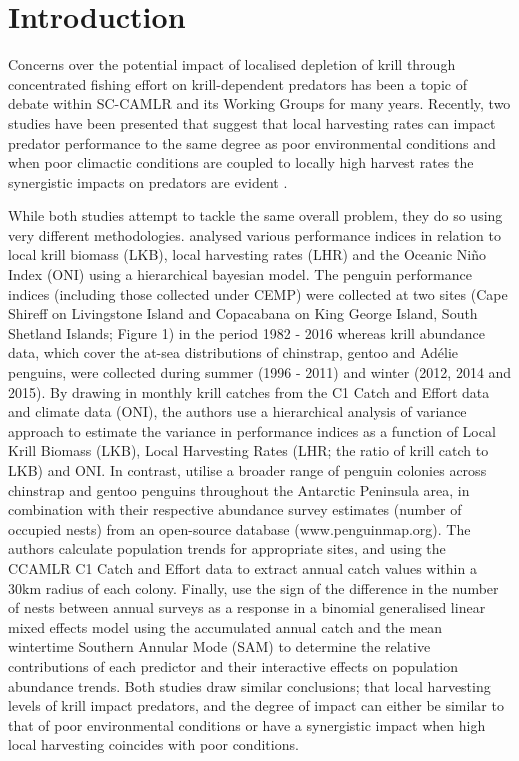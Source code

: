 \documentclass[]{elsarticle} %
\begin{document}
\section{Introduction}\label{introduction}

Concerns over the potential impact of localised depletion of krill
through concentrated fishing effort on krill-dependent predators has
been a topic of debate within SC-CAMLR and its Working Groups for many
years. Recently, two studies have been presented that suggest that local
harvesting rates can impact predator performance to the same degree as
poor environmental conditions \citep{Watters2020} and when poor
climactic conditions are coupled to locally high harvest rates the
synergistic impacts on predators are evident \citep{Kruger2021}.

While both studies attempt to tackle the same overall problem, they do
so using very different methodologies. \citet{Watters2020} analysed
various performance indices in relation to local krill biomass (LKB),
local harvesting rates (LHR) and the Oceanic Niño Index (ONI) using a
hierarchical bayesian model. The penguin performance indices (including
those collected under CEMP) were collected at two sites (Cape Shireff on
Livingstone Island and Copacabana on King George Island, South Shetland
Islands; Figure 1) in the period 1982 - 2016 whereas krill abundance
data, which cover the at-sea distributions of chinstrap, gentoo and
Adélie penguins, were collected during summer (1996 - 2011) and winter
(2012, 2014 and 2015). By drawing in monthly krill catches from the C1
Catch and Effort data and climate data (ONI), the authors use a
hierarchical analysis of variance approach to estimate the variance in
performance indices as a function of Local Krill Biomass (LKB), Local
Harvesting Rates (LHR; the ratio of krill catch to LKB) and ONI. In
contrast, \citet{Kruger2021} utilise a broader range of penguin colonies
across chinstrap and gentoo penguins throughout the Antarctic Peninsula
area, in combination with their respective abundance survey estimates
(number of occupied nests) from an open-source database
(www.penguinmap.org). The authors calculate population trends for
appropriate sites, and using the CCAMLR C1 Catch and Effort data to
extract annual catch values within a 30km radius of each colony.
Finally, \citet{Kruger2021} use the sign of the difference in the number
of nests between annual surveys as a response in a binomial generalised
linear mixed effects model using the accumulated annual catch and the
mean wintertime Southern Annular Mode (SAM) to determine the relative
contributions of each predictor and their interactive effects on
population abundance trends. Both studies draw similar conclusions; that
local harvesting levels of krill impact predators, and the degree of
impact can either be similar to that of poor environmental conditions or
have a synergistic impact when high local harvesting coincides with poor
conditions.
\end{document}
